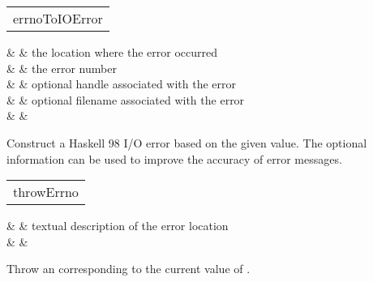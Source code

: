 \begin{haddockdesc}
\item[\begin{tabular}{@{}l}
errnoToIOError
\end{tabular}]\haddockbegindoc
\haddockbeginargs
\haddockdecltt{::} &  & the location where the error occurred
 \\
                                              \haddockdecltt{->} &  & the error number
 \\
                                                                                           \haddockdecltt{->} &  & optional handle associated with the error
 \\
                                                                                                                                               \haddockdecltt{->} &  & optional filename associated with the error
 \\
                                                                                                                                                                                                   \haddockdecltt{->} &  & \\
\haddockendargs\par
Construct a Haskell 98 I/O error based on the given  value.
 The optional information can be used to improve the accuracy of
 error messages.
\par

\end{haddockdesc}
\begin{haddockdesc}
\item[\begin{tabular}{@{}l}
throwErrno
\end{tabular}]\haddockbegindoc
\haddockbeginargs
\haddockdecltt{::} &  & textual description of the error location
 \\
                                              \haddockdecltt{->} &  & \\
\haddockendargs\par
Throw an  corresponding to the current value of .
\par

\end{haddockdesc}
